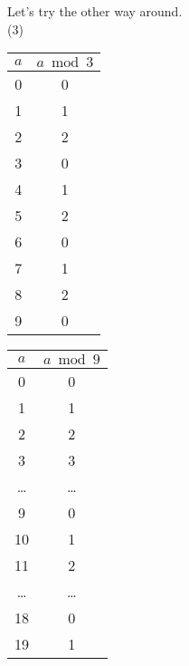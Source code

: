 \noindent
Let's try the other way around.\\
(3)
\noindent
\begin{minipage}{0.32\textwidth}
    \centering
    \begin{tabular}{c|c}
        \rowcolor{OliveGreen!10}$a$ & $a \bmod 3$ \\
        \hline
        0                           & 0           \\
        1                           & 1           \\
        2                           & 2           \\
        3                           & 0           \\
        4                           & 1           \\
        5                           & 2           \\
        6                           & 0           \\
        7                           & 1           \\
        8                           & 2           \\
        9                           & 0           \\
    \end{tabular}
\end{minipage}%
\begin{minipage}{0.32\textwidth}
    \centering
    \begin{tabular}{c|c}
        \rowcolor{OliveGreen!10}$a$ & $a \bmod 9$ \\
        \hline
        0                           & 0           \\
        1                           & 1           \\
        2                           & 2           \\
        3                           & 3           \\
        \dots                       & \dots       \\
        9                           & 0           \\
        10                          & 1           \\
        11                          & 2           \\
        \dots                       & \dots       \\
        18                          & 0           \\
        19                          & 1           \\
    \end{tabular}
\end{minipage}%
